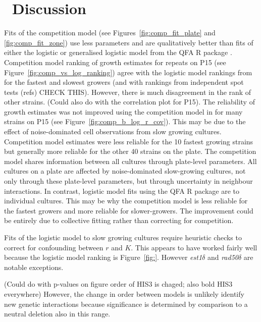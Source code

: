 \graphicspath{{images/}}

\section{\thesection~Discussion}
\label{sec:discussion}

Fits of the competition model (see Figures~\ref{fig:comp_fit_plate}
and \ref{fig:comp_fit_zone}) use less parameters and are qualitatively
better than fits of either the logistic or generalised logistic model
from the QFA R package \citep{Addinall2011,qfa2016}. Competition model
ranking of growth estimates for repeats on P15 (see
Figure~\ref{fig:comp_vs_log_ranking}) agree with the logistic model
rankings from \citet{Addinall2011} for the fastest and slowest growers
(and with rankings from independent spot tests (refs) CHECK
THIS). However, there is much disagreement in the rank of other
strains. (Could also do with the correlation plot for P15). The
reliability of growth estimates was not improved using the competition
model in for many strains on P15 (see
Figure~\ref{fig:comp_b_log_r_cov}). This may be due to the effect of
noise-dominated cell observations from slow growing cultures.
Competition model estimates were less reliable for the 10 fastest
growing strains but generally more reliable for the other 40 strains
on the plate. The competition model shares information between all
cultures through plate-level parameters. All cultures on a plate are
affected by noise-dominated slow-growing cultures, not only through
these plate-level parameters, but through uncertainty in neighbour
interactions. In contrast, logistic model fits using the QFA R package
are to individual cultures. This may be why the competition model is
less reliable for the fastest growers and more reliable for
slower-growers. The improvement could be entirely due to collective
fitting rather than correcting for competition.




Fits of the logistic model to slow growing cultures require heuristic
checks to correct for confounding between \(r\) and \(K\). This
appears to have worked fairly well because the logistic model ranking
is Figure~\ref{fig:}. However \textit{est1\(\delta\)} and
\textit{rad50\(\delta\)} are notable exceptions.


(Could do with p-values on figure order of HIS3 is chaged; also bold
HIS3 everywhere) However, the change in order between models is
unlikely identify new genetic interactions because significance is
determined by comparison to a neutral deletion also in this range.






